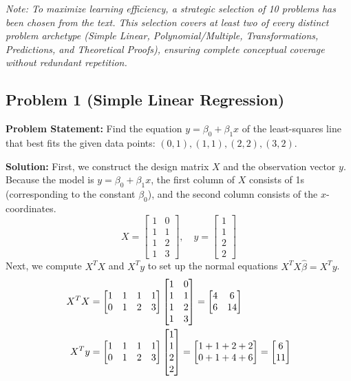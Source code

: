 \documentclass[11pt, letterpaper]{article}
\theoremstyle{definition}
\theoremstyle{remark}
\begin{document}
\textit{Note: To maximize learning efficiency, a strategic selection of 10 problems has been chosen from the text. This selection covers at least two of every distinct problem archetype (Simple Linear, Polynomial/Multiple, Transformations, Predictions, and Theoretical Proofs), ensuring complete conceptual coverage without redundant repetition.}

\subsection*{Problem 1 (Simple Linear Regression)}
\textbf{Problem Statement:} Find the equation $y = \beta_0 + \beta_1 x$ of the least-squares line that best fits the given data points: $(0, 1), (1, 1), (2, 2), (3, 2)$.

\textbf{Solution:}
First, we construct the design matrix $X$ and the observation vector $y$. Because the model is $y = \beta_0 + \beta_1 x$, the first column of $X$ consists of 1s (corresponding to the constant $\beta_0$), and the second column consists of the $x$-coordinates.
\[
X = \begin{bmatrix} 1 & 0 \\ 1 & 1 \\ 1 & 2 \\ 1 & 3 \end{bmatrix}, \quad y = \begin{bmatrix} 1 \\ 1 \\ 2 \\ 2 \end{bmatrix}
\]
Next, we compute $X^T X$ and $X^T y$ to set up the normal equations $X^T X \hat{\beta} = X^T y$.
\begin{align*}
X^T X &= \begin{bmatrix} 1 & 1 & 1 & 1 \\ 0 & 1 & 2 & 3 \end{bmatrix} \begin{bmatrix} 1 & 0 \\ 1 & 1 \\ 1 & 2 \\ 1 & 3 \end{bmatrix} = \begin{bmatrix} 4 & 6 \\ 6 & 14 \end{bmatrix} \\ \relax
X^T y &= \begin{bmatrix} 1 & 1 & 1 & 1 \\ 0 & 1 & 2 & 3 \end{bmatrix} \begin{bmatrix} 1 \\ 1 \\ 2 \\ 2 \end{bmatrix} = \begin{bmatrix} 1+1+2+2 \\ 0+1+4+6 \end{bmatrix} = \begin{bmatrix} 6 \\ 11 \end{bmatrix}
\end{align*}
\end{document}
